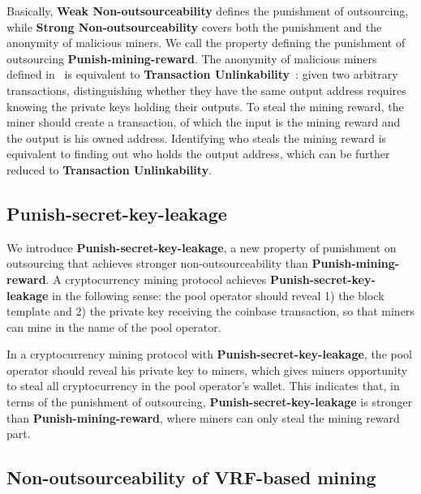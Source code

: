 Basically, \textbf{Weak Non-outsourceability} defines the punishment of outsourcing, while \textbf{Strong Non-outsourceability} covers both the punishment and the anonymity of malicious miners.
We call the property defining the punishment of outsourcing \textbf{Punish-mining-reward}.
The anonymity of malicious miners defined in~\cite{miller2015nonoutsourceable} is equivalent to \textbf{Transaction Unlinkability}~\cite{van2013cryptonote}: given two arbitrary transactions, distinguishing whether they have the same output address requires knowing the private keys holding their outputs.
To steal the mining reward, the miner should create a transaction, of which the input is the mining reward and the output is his owned address.
Identifying who steals the mining reward is equivalent to finding out who holds the output address, which can be further reduced to \textbf{Transaction Unlinkability}.


\subsection{Punish-secret-key-leakage}

We introduce \textbf{Punish-secret-key-leakage}, a new property of punishment on outsourcing that achieves stronger non-outsourceability than \textbf{Punish-mining-reward}.
A cryptocurrency mining protocol achieves \textbf{Punish-secret-key-leakage} in the following sense: the pool operator should reveal 1) the block template and 2) the private key receiving the coinbase transaction, so that miners can mine in the name of the pool operator.

In a cryptocurrency mining protocol with \textbf{Punish-secret-key-leakage}, the pool operator should reveal his private key to miners, which gives miners opportunity to steal all cryptocurrency in the pool operator's wallet.
This indicates that, in terms of the punishment of outsourcing, \textbf{Punish-secret-key-leakage} is stronger than \textbf{Punish-mining-reward}, where miners can only steal the mining reward part.






\subsection{Non-outsourceability of VRF-based mining}

